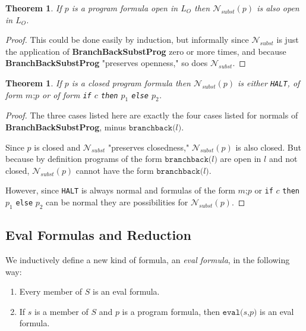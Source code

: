 \documentclass[11pt]{article}
\begin{document}
\newtheorem*{nsubstpreservesopenness}{Theorem}
\begin{nsubstpreservesopenness}
If $p$ is a program formula open in $L_{O}$ then $\mathcal{N}_{subst}(p)$ is also open in $L_{O}$.
\end{nsubstpreservesopenness}
\begin{proof}
This could be done easily by induction, but informally since $\mathcal{N}_{subst}$ is just the application of \textbf{BranchBackSubstProg} zero or more times, and because \textbf{BranchBackSubstProg} "preserves openness," so does $\mathcal{N}_{subst}$.
\end{proof}

\newtheorem*{openformulanormalforms}{Theorem}
\begin{openformulanormalforms}
If $p$ is a closed program formula then $\mathcal{N}_{subst}(p)$ is either \texttt{HALT}, of form $m\texttt{;}p$ or of form \texttt{if} $c$ \texttt{then} $p_{1}$ \texttt{else} $p_{2}$.
\end{openformulanormalforms}

\begin{proof}
The three cases listed here are exactly the four cases listed for normals of \textbf{BranchBackSubstProg}, minus $\texttt{branchback(}l\texttt{)}$.

Since $p$ is closed and $\mathcal{N}_{subst}$ "preserves closedness," $\mathcal{N}_{subst}(p)$ is also closed.  But because by definition programs of the form $\texttt{branchback(}l\texttt{)}$ are open in ${l}$ and not closed, $\mathcal{N}_{subst}(p)$ cannot have the form $\texttt{branchback(}l\texttt{)}$.

However, since \texttt{HALT} is always normal and formulas of the form $m\texttt{;}p$ or \texttt{if} $c$ \texttt{then} $p_{1}$ \texttt{else} $p_{2}$ can be normal they are possibilities for $\mathcal{N}_{subst}(p)$.
\end{proof}

\subsection{Eval Formulas and Reduction}

We inductively define a new kind of formula, an \emph{eval formula}, in the following way:

\begin{enumerate}
\item Every member of $S$ is an eval formula.
\item If $s$ is a member of $S$ and $p$ is a program formula, then $\texttt{eval(}s\texttt{,} p\texttt{)}$ is an eval formula.
\end{enumerate}
\end{document}
